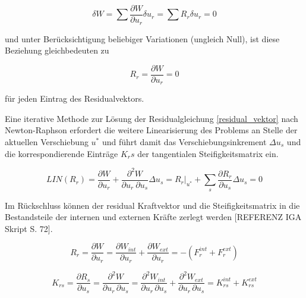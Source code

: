 \documentclass[german,a4paper,12pt,oneside]{scrbook}
\theoremstyle{definition}
\theoremstyle{definition}
\theoremstyle{definition}
\theoremstyle{definition}
\theoremstyle{definition}
\theoremstyle{definition}
\begin{document}
\begin{equation}
    \delta W = \sum{\frac{\partial W}{\partial u_r} \delta u_r} 
    = \sum{R_r \delta u_r}  = 0
\end{equation}

\vspace{0.5cm}
und unter Berücksichtigung beliebiger Variationen (ungleich Null), ist diese Beziehung  gleichbedeuten zu 

\begin{equation} \label{residual_vektor}
    R_r = \frac{\partial W}{\partial u_r} = 0
\end{equation}

\vspace{0.5cm}
für jeden Eintrag des Residualvektors.


\vspace{0.5cm}
Eine iterative Methode zur Lösung der Residualgleichung \eqref{residual_vektor} nach Newton-Raphson erfordert die weitere Linearisierung des Problems an Stelle der aktuellen Verschiebung $u^*$  und führt damit das Verschiebungsinkrement $\Delta u_s$ und die korrespondierende Einträge $K_rs$ der tangentialen Steifigkeitsmatrix ein.

\begin{equation}
    LIN(R_r) = 
    \frac{\partial W}{\partial u_r} + 
    \frac{\partial ^2 W }{\partial u_r \: \partial u_s} \Delta u_s = 
    R_r \bigg\rvert_{u^*} + \sum_{s}{\frac{\partial R_r}{\partial u_s} \Delta u_s = 0}
\end{equation}

\vspace{0.5cm}
Im Rückschluss können der residual Kraftvektor und die Steifigkeitsmatrix in die Bestandsteile der internen und externen Kräfte zerlegt werden [REFERENZ IGA Skript S. 72].

\begin{equation}
    R_r = \frac{\partial W}{\partial u_r} = \frac{\partial W_{int}}{\partial u_r} + \frac{\partial W_{ext}}{\partial u_r} = -(F_{r}^{int} + F_{r}^{ext} )
\end{equation}

\begin{equation}
    K_{rs} = \frac{\partial R_s}{\partial u_s} = 
    \frac{\partial ^2 W}{\partial u_r \, \partial u_s} = 
    \frac{\partial ^2 W_{int}}{\partial u_r \, \partial u_s} + 
    \frac{\partial ^2 W_{ext}}{\partial u_r \, \partial u_s} = 
    K_{rs}^{int} + K_{rs}^{ext}
\end{equation}
\end{document}

